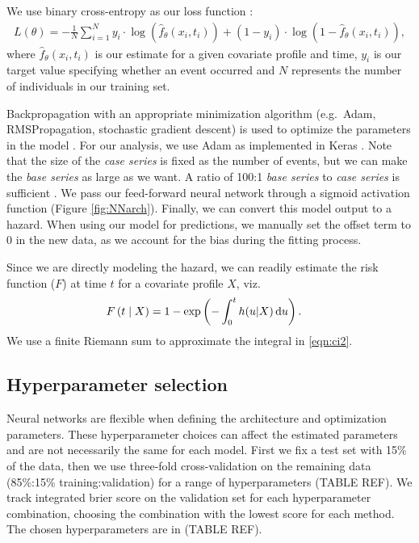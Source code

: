 \documentclass[APA,LATO1COL]{WileyNJD-v2}
\begin{document}
We use binary cross-entropy as our loss function \citep{gulli2017}:
\begin{align*}
L(\theta)=-\frac{1}{N} \sum^{N}_{i=1} y_{i} \cdot \log(\hat{f}_{\theta}(x_{i}, t_{i}) ) + (1-y_{i} )\cdot \log(1-\hat{f}_{\theta}(x_{i}, t_{i}) ),
\end{align*} where \(\hat{f}_{\theta}(x_{i}, t_{i})\) is our estimate
for a given covariate profile and time, \(y_{i}\) is our target value
specifying whether an event occurred and \(N\) represents the number of
individuals in our training set.

Backpropagation with an appropriate minimization algorithm (e.g.~Adam,
RMSPropagation, stochastic gradient descent) is used to optimize the
parameters in the model \citep{gulli2017}. For our analysis, we use Adam
as implemented in Keras \citep{gulli2017}. Note that the size of the
\emph{case series} is fixed as the number of events, but we can make the
\emph{base series} as large as we want. A ratio of 100:1 \emph{base
series} to \emph{case series} is sufficient \citep{hanley2009}. We pass
our feed-forward neural network through a sigmoid activation function
(Figure \ref{fig:NNarch}). Finally, we can convert this model output to
a hazard. When using our model for predictions, we manually set the
offset term to 0 in the new data, as we account for the bias during the
fitting process.

Since we are directly modeling the hazard, we can readily estimate the
risk function (\(F\)) at time \(t\) for a covariate profile \(X\),
viz.\begin{align}\label{eqn:ci2}
F\left(t\mid X\right)& = 1 - \exp\left(-\int_{0}^{t}h(u|X) \,\textrm du\right).
\end{align} We use a finite Riemann sum \citep{hughes2020calculus} to
approximate the integral in \eqref{eqn:ci2}.

\hypertarget{hyperparameter-selection}{%
\subsection{Hyperparameter selection}\label{hyperparameter-selection}}

Neural networks are flexible when defining the architecture and
optimization parameters. These hyperparameter choices can affect the
estimated parameters and are not necessarily the same for each model.
First we fix a test set with 15\% of the data, then we use three-fold cross-validation on the remaining 
data (85\%:15\% training:validation) for a range of hyperparameters (TABLE REF). We track integrated brier 
score on the validation set for each hyperparameter combination, choosing 
the combination with the lowest score for each method. The chosen 
hyperparameters are in (TABLE REF).
\end{document}
